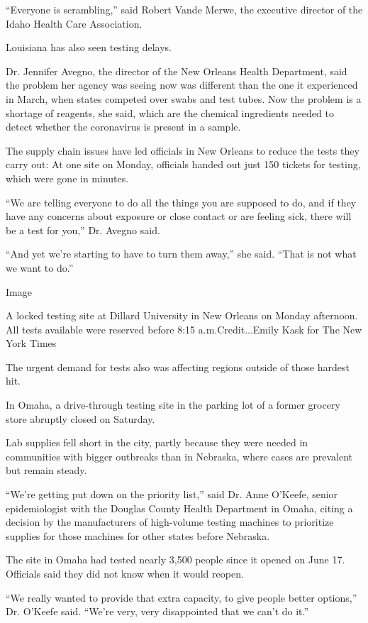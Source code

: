 ``Everyone is scrambling,'' said Robert Vande Merwe, the executive
director of the Idaho Health Care Association.

Louisiana has also seen testing delays.

Dr. Jennifer Avegno, the director of the New Orleans Health Department,
said the problem her agency was seeing now was different than the one it
experienced in March, when states competed over swabs and test tubes.
Now the problem is a shortage of reagents, she said, which are the
chemical ingredients needed to detect whether the coronavirus is present
in a sample.

The supply chain issues have led officials in New Orleans to reduce the
tests they carry out: At one site on Monday, officials handed out just
150 tickets for testing, which were gone in minutes.

``We are telling everyone to do all the things you are supposed to do,
and if they have any concerns about exposure or close contact or are
feeling sick, there will be a test for you,'' Dr. Avegno said.

``And yet we're starting to have to turn them away,'' she said. ``That
is not what we want to do.''

Image

A locked testing site at Dillard University in New Orleans on Monday
afternoon. All tests available were reserved before 8:15
a.m.Credit...Emily Kask for The New York Times

The urgent demand for tests also was affecting regions outside of those
hardest hit.

In Omaha, a drive-through testing site in the parking lot of a former
grocery store abruptly closed on Saturday.

Lab supplies fell short in the city, partly because they were needed in
communities with bigger outbreaks than in Nebraska, where cases are
prevalent but remain steady.

``We're getting put down on the priority list,'' said Dr. Anne O'Keefe,
senior epidemiologist with the Douglas County Health Department in
Omaha, citing a decision by the manufacturers of high-volume testing
machines to prioritize supplies for those machines for other states
before Nebraska.

The site in Omaha had tested nearly 3,500 people since it opened on June
17. Officials said they did not know when it would reopen.

``We really wanted to provide that extra capacity, to give people better
options,'' Dr. O'Keefe said. ``We're very, very disappointed that we
can't do it.''

